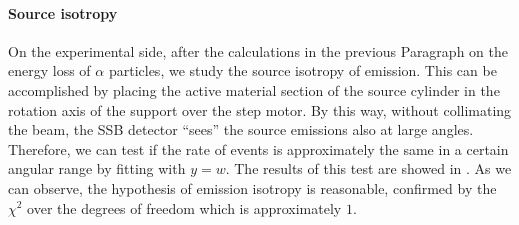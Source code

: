 \documentclass[../../main/main.tex]{subfiles}
\begin{document}
\paragraph{Source isotropy}
On the experimental side, after the calculations in the previous Paragraph on the energy loss of \( \alpha \) particles, we study the source isotropy of emission. This can be accomplished by placing the active material section of the source cylinder in the rotation axis of the support over the step motor. By this way, without collimating the beam, the SSB detector ``sees'' the source emissions also at large angles. Therefore, we can test if the rate of events is approximately the same in a certain angular range by fitting with \( y = w \). The results of this test are showed in . As we can observe, the hypothesis of emission isotropy is reasonable, confirmed by the \( \chi^{2} \) over the degrees of freedom which is approximately \( 1 \).
\end{document}
